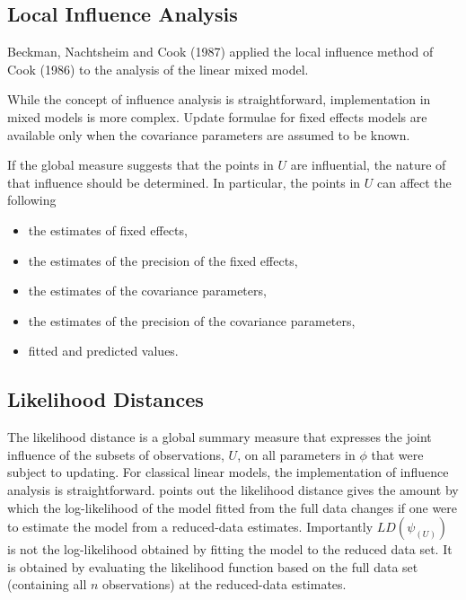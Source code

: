 \documentclass[Main.tex]{subfiles}
\begin{document}
\newpage
\subsection{Local Influence Analysis}



Beckman, Nachtsheim and Cook (1987)  applied the local influence method of Cook (1986) to the analysis of the linear mixed model.

While the concept of influence analysis is straightforward, implementation in mixed models is more complex. Update formulae for fixed effects models are available only when the covariance parameters are assumed to be known.

If the global measure suggests that the points in $U$ are influential, the nature of that influence should be determined. In particular, the points in $U$ can affect the following

\begin{itemize}
	\item the estimates of fixed effects,
	\item the estimates of the precision of the fixed effects,
	\item the estimates of the covariance parameters,
	\item the estimates of the precision of the covariance parameters,
	\item fitted and predicted values.
\end{itemize}


\newpage
\subsection{Likelihood Distances}

The  likelihood distance is a global summary measure that expresses the joint influence of the subsets of observations, $U$, on all parameters in $\phi$ that were subject to updating. For classical linear models, the implementation of influence analysis is straightforward. \citet{schab} points out the likelihood distance gives the amount by which the log-likelihood of the model fitted from the full data changes if one were
to estimate the model from a reduced-data estimates. Importantly $LD(\psi_{(U)})$ is not the log-likelihood obtained by fitting the model to the reduced data set. It is obtained by evaluating the likelihood function based on the full data set (containing all $n$ observations) at the reduced-data estimates.
\end{document}
